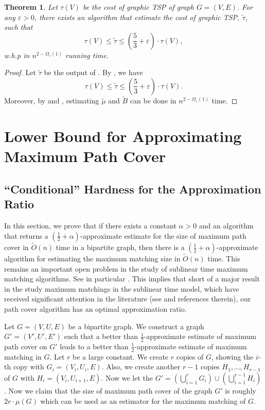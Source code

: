 \documentclass[letterpaper,11pt]{article}
\renewcommand{\epsilon}{\varepsilon}
\newcommand{\tspsize}[1]{\ensuremath{\tau}(#1)}
\newtheorem{theorem}{Theorem}[section]
\newenvironment{myproof}{
\vspace{-0.5cm}
\begin{proof}
}{
\end{proof}
}
\begin{document}
\begin{theorem}\label{thm: graphic-tsp3}
Let $\tspsize{V}$ be the cost of graphic TSP of graph $G = (V, E)$. For any $\epsilon > 0$, there exists an algorithm that estimate the cost of graphic TSP, $\tilde{\tau}$, such that
$$
\tspsize{V} \leq \tilde{\tau} \leq (\frac{5}{3} + \epsilon) \cdot \tspsize{V},
$$
w.h.p in $n^{2-\Omega_\epsilon(1)}$ running time. \vspace{3pt}
\end{theorem}
\begin{myproof}
Let $\tilde{\tau}$ be the output of . By , we have 
$$
\tspsize{V} \leq \tilde{\tau} \leq (\frac{5}{3} + \epsilon) \cdot \tspsize{V}.
$$
Moreover, by  and , estimating $\tilde{\mu}$ and $\tilde{B}$ can be done in $n^{2-\Omega_\epsilon(1)}$ time.
\end{myproof}





\section{Lower Bound for Approximating Maximum Path Cover}\label{sec:lowerbound}


\subsection{``Conditional'' Hardness for the Approximation Ratio}
In this section, we prove that if there exists a constant $\alpha > 0$ and an algorithm that returns a $(\frac{1}{2} + \alpha)$-approximate estimate for the size of maximum path cover in $\tilde{O}(n)$ time in a bipartite graph, then there is a $(\frac{1}{2} + \alpha)$-approximate algorithm for estimating the maximum matching size in $\tilde{O}(n)$ time. This remains an important open problem in the study of sublinear time maximum matching algorithms. See in particular \cite{BehnezhadRRS-ArXiv22}. This implies that short of a major result in the study maximum matchings in the sublinear time model, which have received significant attention in the literature (see \cite{YoshidaYI09,behnezhad2021,BehnezhadRRS-ArXiv22, behnezhadroghanirubinstein2022, sayanSublinear2022} and references therein), our path cover algorithm has an optimal approximation ratio.


Let $G = (V, U, E)$ be a bipartite graph.  We construct a graph $G' = (V', U', E')$ such that a better than $\frac{1}{2}$-approximate estimate of maximum path cover on $G'$ leads to a better than $\frac{1}{2}$-approximate estimate of maximum matching in $G$. Let $r$ be a large constant. We create $r$ copies of $G$, showing the $i$-th copy with $G_i=(V_i, U_i, E)$. Also, we create another $r-1$ copies $H_{1}, \ldots, H_{r-1}$ of $G$ with $H_i = (V_i, U_{i+1}, E)$. Now we let the $G' = (\bigcup_{i=1}^r G_i) \cup (\bigcup_{i=1}^{r-1}H_i)$. Now we claim that the size of maximum path cover of the graph $G'$ is roughly $2r\cdot \mu(G)$ which can be used as an estimator for the maximum matching of $G$.
\end{document}
